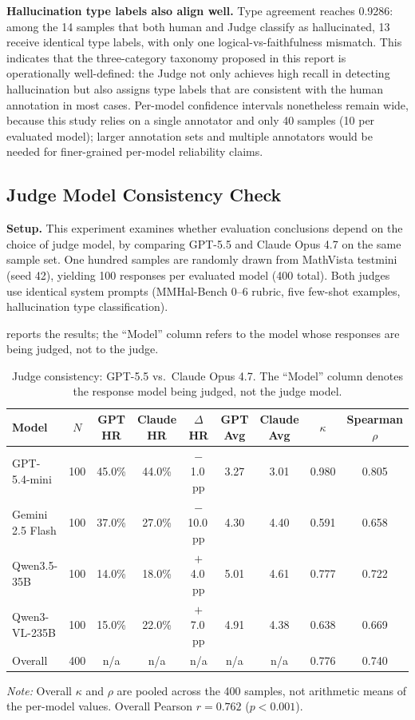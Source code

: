 \textbf{Hallucination type labels also align well.}
Type agreement reaches 0.9286:
among the 14 samples
that both human and Judge classify as hallucinated,
13 receive identical type labels,
with only one logical-vs-faithfulness mismatch.
This indicates that the three-category taxonomy
proposed in this report is operationally well-defined:
the Judge not only achieves high recall
in detecting hallucination
but also assigns type labels that are consistent
with the human annotation in most cases.
Per-model confidence intervals nonetheless remain wide,
because this study relies on a single annotator
and only 40 samples (10 per evaluated model);
larger annotation sets and multiple annotators
would be needed for finer-grained per-model
reliability claims.

\subsection{Judge Model Consistency Check}

\textbf{Setup.}
This experiment examines whether evaluation conclusions
depend on the choice of judge model,
by comparing GPT-5.5 and Claude Opus 4.7
on the same sample set.
One hundred samples are randomly drawn
from MathVista testmini (seed 42),
yielding 100 responses per evaluated model (400 total).
Both judges use identical system prompts
(MMHal-Bench 0--6 rubric, five few-shot examples,
hallucination type classification).

 reports the results;
the ``Model'' column refers to the model whose responses are being judged,
not to the judge.

\begin{table}[htbp]
  \centering
  \caption{Judge consistency: GPT-5.5 vs.\ Claude Opus 4.7.
    The ``Model'' column denotes the response model being judged,
    not the judge model.}
  \label{tab:judge_consistency}
  \small
  \setlength{\tabcolsep}{3pt}
  \begin{tabular}{lc ccc cc cc}
    \toprule
    Model & $N$ & GPT HR & Claude HR & $\Delta$HR
      & GPT Avg & Claude Avg & $\kappa$ & Spearman $\rho$ \\
    \midrule
    GPT-5.4-mini     & 100 & 45.0\% & 44.0\% & $-$1.0\,pp  & 3.27 & 3.01 & 0.980 & 0.805 \\
    Gemini 2.5 Flash & 100 & 37.0\% & 27.0\% & $-$10.0\,pp & 4.30 & 4.40 & 0.591 & 0.658 \\
    Qwen3.5-35B      & 100 & 14.0\% & 18.0\% & $+$4.0\,pp  & 5.01 & 4.61 & 0.777 & 0.722 \\
    Qwen3-VL-235B    & 100 & 15.0\% & 22.0\% & $+$7.0\,pp  & 4.91 & 4.38 & 0.638 & 0.669 \\
    \midrule
    Overall          & 400 & n/a & n/a & n/a & n/a & n/a & 0.776 & 0.740 \\
    \bottomrule
  \end{tabular}

  \vspace{0.3em}
  \small
  \textit{Note:} Overall $\kappa$ and $\rho$ are pooled across the 400 samples,
  not arithmetic means of the per-model values.
  Overall Pearson $r = 0.762$ ($p < 0.001$).
\end{table}

